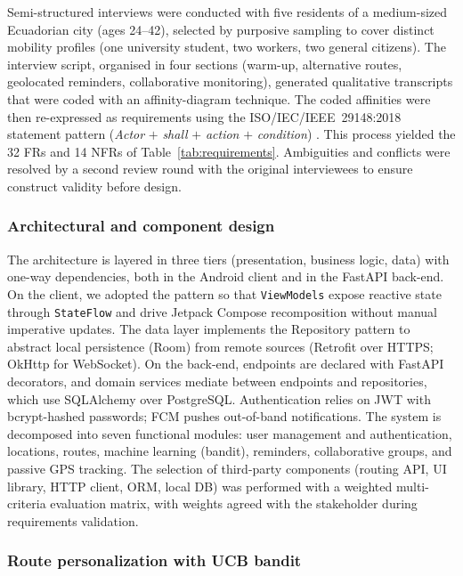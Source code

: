 \documentclass[a4paper,fleqn]{cas-sc}
\begin{document}
	Semi-structured interviews were conducted with five residents of a medium-sized Ecuadorian city (ages 24--42), selected by purposive sampling to cover distinct mobility profiles (one university student, two workers, two general citizens). The interview script, organised in four sections (warm-up, alternative routes, geolocated reminders, collaborative monitoring), generated qualitative transcripts that were coded with an affinity-diagram technique. The coded affinities were then re-expressed as requirements using the ISO/IEC/IEEE~29148:2018 statement pattern (\emph{Actor} $+$ \emph{shall} $+$ \emph{action} $+$ \emph{condition}) \citep{iso29148}. This process yielded the 32 FRs and 14 NFRs of Table~\ref{tab:requirements}. Ambiguities and conflicts were resolved by a second review round with the original interviewees to ensure construct validity before design.
	
	\subsubsection{Architectural and component design}\label{sec:arch}
	
	The architecture is layered in three tiers (presentation, business logic, data) with one-way dependencies, both in the Android client and in the FastAPI back-end. On the client, we adopted the \MVVM{} pattern so that \texttt{ViewModels} expose reactive state through \texttt{StateFlow} and drive Jetpack Compose recomposition without manual imperative updates. The data layer implements the Repository pattern to abstract local persistence (Room) from remote sources (Retrofit over HTTPS; OkHttp for WebSocket). On the back-end, endpoints are declared with FastAPI decorators, and domain services mediate between endpoints and repositories, which use SQLAlchemy over PostgreSQL. Authentication relies on JWT with bcrypt-hashed passwords; FCM pushes out-of-band notifications. The system is decomposed into seven functional modules: user management and authentication, locations, routes, machine learning (bandit), reminders, collaborative groups, and passive GPS tracking. The selection of third-party components (routing API, UI library, HTTP client, ORM, local DB) was performed with a weighted multi-criteria evaluation matrix, with weights agreed with the stakeholder during requirements validation.
	
	\subsubsection{Route personalization with UCB bandit}\label{sec:ucb}
	
\end{document}
